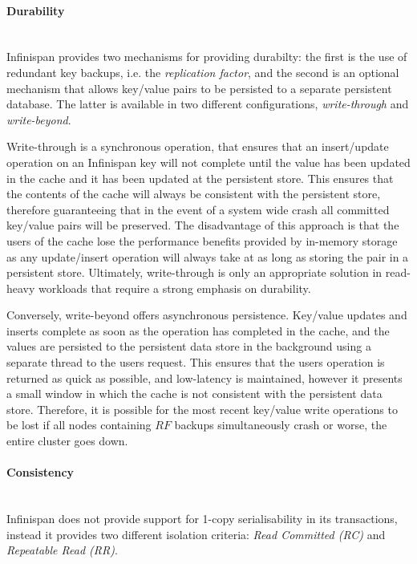 		    \paragraph{Durability} \hspace{0pt} \\
		    Infinispan provides two mechanisms for providing durabilty: the first is the use of redundant key backups, i.e. the \emph{replication factor}, and the second is an optional mechanism that allows key/value pairs to be persisted to a separate persistent database.  The latter is available in two different configurations, \emph{write-through} and \emph{write-beyond}. 
		    
		    Write-through is a synchronous operation, that ensures that an insert/update operation on an Infinispan key will not complete until the value has been updated in the cache and it has been updated at the persistent store.  This ensures that the contents of the cache will always be consistent with the persistent store, therefore guaranteeing that in the event of a system wide crash all committed key/value pairs will be preserved.  The disadvantage of this approach is that the users of the cache lose the performance benefits provided by in-memory storage as any update/insert operation will always take at as long as storing the pair in a persistent store.  Ultimately, write-through is only an appropriate solution in read-heavy workloads that require a strong emphasis on durability.  
		    
		    Conversely, write-beyond offers asynchronous persistence.  Key/value updates and inserts complete as soon as the operation has completed in the cache, and the values are persisted to the persistent data store in the background using a separate thread to the users request.  This ensures that the users operation is returned as quick as possible, and low-latency is maintained, however it presents a small window in which the cache is not consistent with the persistent data store.  Therefore, it is possible for the most recent key/value write operations to be lost if all nodes containing $RF$ backups simultaneously crash or worse, the entire cluster goes down.  
    
	        \paragraph{Consistency} \hspace{0pt} \\ \label{consistency}
	        Infinispan does not provide support for 1-copy serialisability in its transactions, instead it provides two different isolation criteria: \emph{Read Committed (RC)} and \emph{Repeatable Read (RR)}.  
	        
